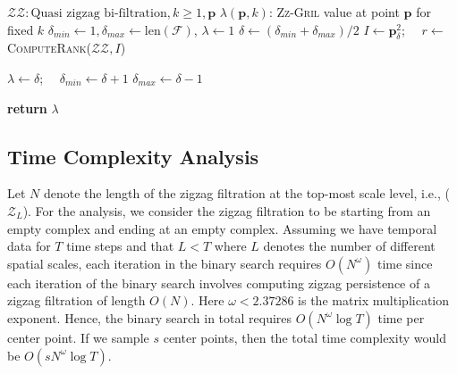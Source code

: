 \documentclass{article}
\newcommand{\zzgril}{\textsc{Zz-Gril}}
\newcommand{\vp}{\mathbf{p}}
\theoremstyle{plain}
\theoremstyle{definition}
\theoremstyle{remark}
\begin{document}
\begin{algorithm}[h!]
\caption{\textsc{Compute\zzgril}}\label{alg:CompZZGRIL}
\begin{algorithmic}
\small 
    $\mathcal{ZZ}: \text{Quasi zigzag bi-filtration}, k\geq 1, \vp$
    $\lambda(\vp, k)$:  \zzgril{} value at point $\vp$ for  fixed $k$
    $\delta_{min} \gets 1, \delta_{max} \gets \text{len}(\mathcal{F})$, $\lambda \gets 1$ 
   \STATE $\delta \gets  (\delta_{min} + \delta_{max}) / 2 $
   \STATE $I \gets \boxed{\vp}^2_\delta$;~~ $r \gets$ \textsc{ComputeRank($\mathcal{ZZ}, I$)}
   
        \STATE $\lambda \gets \delta$;~~ $\delta_{min} \gets \delta+1$
    \ELSE
        \STATE $\delta_{max} \gets \delta-1$ 
    \ENDIF
    \ENDWHILE
    
\STATE \textbf{return} {$\lambda$}

\end{algorithmic}
\end{algorithm}   

\subsection{Time Complexity Analysis}
\label{asubsec:complexity}
Let $N$ denote the length of the zigzag filtration at the top-most scale level, i.e., ($\mathcal{Z}_L$). For the analysis, we consider the zigzag filtration to be starting from an empty complex and ending at an empty complex. Assuming we have temporal data for $T$ time steps and that $L < T$ where $L$ denotes the number of different spatial scales, each iteration in the binary search requires $O(N^\omega)$ time since each iteration of the binary search involves computing zigzag persistence of a zigzag filtration of length $O(N)$. Here $\omega < 2.37286$ is the matrix multiplication exponent. Hence, the binary search in total requires $O(N^\omega \log T)$ time per center point. If we sample $s$ center points, then the total time complexity would be $O(sN^\omega \log T)$.

\end{document}
